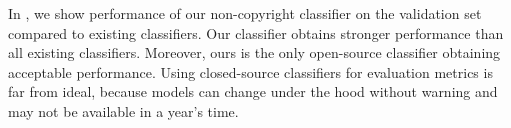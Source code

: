 In , we show performance of our non-copyright classifier on the validation set compared to existing classifiers. Our classifier obtains stronger performance than all existing classifiers. Moreover, ours is the only open-source classifier obtaining acceptable performance. Using closed-source classifiers for evaluation metrics is far from ideal, because models can change under the hood without warning and may not be available in a year's time.

